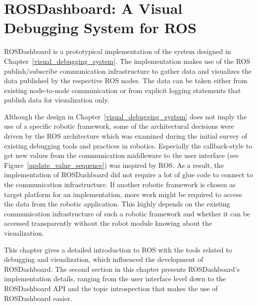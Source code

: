 \chapter{ROSDashboard: A Visual Debugging System for ROS}
\label{rosdashboard}

ROSDashboard is a prototypical implementation of the system designed in Chapter~\ref{visual_debugging_system}. The implementation makes use of the ROS publish/subscribe communication infrastructure to gather data and visualizes the data published by the respective ROS nodes. The data can be taken either from existing node-to-node communication or from explicit logging statements that publish data for visualization only.

Although the design in Chapter~\ref{visual_debugging_system} does not imply the use of a specific robotic framework, some of the architectural decisions were driven by the ROS architecture which was examined during the initial survey of existing debugging tools and practices in robotics. Especially the callback-style to get new values from the communication middleware to the user interface (see Figure~\ref{update_value_sequence}) was inspired by ROS. As a result, the implementation of ROSDashboard did not require a lot of glue code to connect to the communication infrastructure. If another robotic framework is chosen as target platform for an implementation, more work might be required to access the data from the robotic application. This highly depends on the existing communication infrastructure of such a robotic framework and whether it can be accessed transparently without the robot module knowing about the visualization.

This chapter gives a detailed introduction to ROS with the tools related to debugging and visualization, which influenced the development of ROSDashboard. The second section in this chapter presents ROSDashboard's implementation details, ranging from the user interface level down to the ROSDashboard API and the topic introspection that makes the use of ROSDashboard easier.



